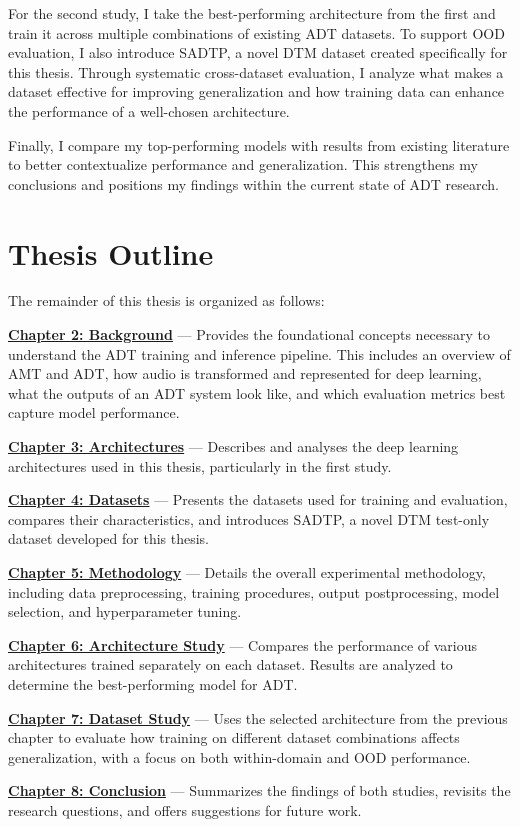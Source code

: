 For the second study, I take the best-performing architecture from the first and train it across multiple combinations of existing \gls{ADT} datasets. To support \acrfull{OOD} evaluation, I also introduce SADTP, a novel \gls{DTM} dataset created specifically for this thesis. Through systematic cross-dataset evaluation, I analyze what makes a dataset effective for improving generalization and how training data can enhance the performance of a well-chosen architecture.

Finally, I compare my top-performing models with results from existing literature to better contextualize performance and generalization. This strengthens my conclusions and positions my findings within the current state of \gls{ADT} research.

\section{Thesis Outline}

The remainder of this thesis is organized as follows:

\noindent \hyperref[Background]{\textbf{Chapter 2: Background}} — Provides the foundational concepts necessary to understand the \gls{ADT} training and inference pipeline. This includes an overview of \gls{AMT} and \gls{ADT}, how audio is transformed and represented for deep learning, what the outputs of an \gls{ADT} system look like, and which evaluation metrics best capture model performance.

\noindent \hyperref[Architectures]{\textbf{Chapter 3: Architectures}} — Describes and analyses the deep learning architectures used in this thesis, particularly in the first study.

\noindent \hyperref[Datasets]{\textbf{Chapter 4: Datasets}} — Presents the datasets used for training and evaluation, compares their characteristics, and introduces SADTP, a novel \gls{DTM} test-only dataset developed for this thesis.

\noindent \hyperref[Methodology]{\textbf{Chapter 5: Methodology}} — Details the overall experimental methodology, including data preprocessing, training procedures, output postprocessing, model selection, and hyperparameter tuning.

\noindent \hyperref[Study1]{\textbf{Chapter 6: Architecture Study}} — Compares the performance of various architectures trained separately on each dataset. Results are analyzed to determine the best-performing model for \gls{ADT}.

\noindent \hyperref[Study2]{\textbf{Chapter 7: Dataset Study}} — Uses the selected architecture from the previous chapter to evaluate how training on different dataset combinations affects generalization, with a focus on both within-domain and \acrfull{OOD} performance.

\noindent \hyperref[Conclusion]{\textbf{Chapter 8: Conclusion}} — Summarizes the findings of both studies, revisits the research questions, and offers suggestions for future work.